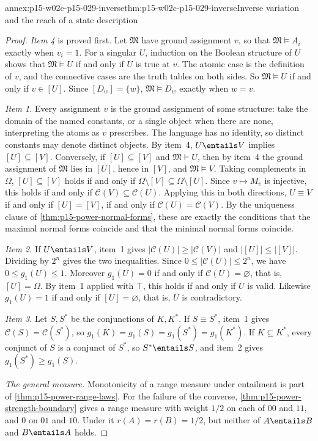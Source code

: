 \begin{annexitem}{annex:p15-w02c-p15-029-inverse}{thm:p15-w02c-p15-029-inverse}{Inverse variation and the reach of a state description}
\begin{proof}
\emph{Item 4} is proved first. Let \(\mathfrak M\) have ground
assignment \(v\), so that \(\mathfrak M\models A_i\) exactly when
\(v_i=1\). For a singular \(U\), induction on the Boolean structure of
\(U\) shows that \(\mathfrak M\models U\) if and only if \(U\) is true at
\(v\). The atomic case is the definition of \(v\), and the connective
cases are the truth tables on both sides. So \(\mathfrak M\models U\) if
and only if \(v\in[U]\). Since \([D_w]=\{w\}\),
\(\mathfrak M\models D_w\) exactly when \(w=v\).

\emph{Item 1.} Every assignment \(v\) is the ground assignment of some
structure: take the domain of the named constants, or a single object
when there are none, interpreting the atoms as \(v\) prescribes. The
language has no identity, so distinct constants may denote distinct
objects. By item~4, \(U\entails V\) implies \([U]\subseteq[V]\).
Conversely, if \([U]\subseteq[V]\) and \(\mathfrak M\models U\), then by
item~4 the ground assignment of \(\mathfrak M\) lies in \([U]\), hence in
\([V]\), and \(\mathfrak M\models V\). Taking complements in \(\Omega\),
\([U]\subseteq[V]\) holds if and only if
\(\Omega\setminus[V]\subseteq\Omega\setminus[U]\). Since
\(v\mapsto M_v\) is injective, this holds if and only if
\(\mathcal C(V)\subseteq\mathcal C(U)\). Applying this in both directions,
\(U\equiv V\) if and only if \([U]=[V]\), if and only if
\(\mathcal C(U)=\mathcal C(V)\). By the uniqueness clause of
\cref{thm:p15-power-normal-forms}, these are exactly the conditions that
the maximal normal forms coincide and that the minimal normal forms
coincide.

\emph{Item 2.} If \(U\entails V\), item~1 gives
\(|\mathcal C(U)|\ge|\mathcal C(V)|\) and \(|[U]|\le|[V]|\). Dividing by
\(2^n\) gives the two inequalities. Since
\(0\le|\mathcal C(U)|\le2^n\), we have \(0\le g_1(U)\le1\). Moreover
\(g_1(U)=0\) if and only if \(\mathcal C(U)=\varnothing\), that is,
\([U]=\Omega\). By item~1 applied with \(\top\), this holds if and only if
\(U\) is valid. Likewise \(g_1(U)=1\) if and only if \([U]=\varnothing\),
that is, \(U\) is contradictory.

\emph{Item 3.} Let \(S,S^\ast\) be the conjunctions of \(K,K^\ast\). If
\(S\equiv S^\ast\), item~1 gives \(\mathcal C(S)=\mathcal C(S^\ast)\),
so \(g_1(K)=g_1(S)=g_1(S^\ast)=g_1(K^\ast)\). If \(K\subseteq K^\ast\),
every conjunct of \(S\) is a conjunct of \(S^\ast\), so
\(S^\ast\entails S\), and item~2 gives \(g_1(S^\ast)\ge g_1(S)\).

\emph{The general measure.} Monotonicity of a range measure under
entailment is part of \cref{thm:p15-power-range-laws}. For the failure of
the converse, \cref{thm:p15-power-strength-boundary} gives a range
measure with weight \(1/2\) on each of \(00\) and \(11\), and \(0\) on
\(01\) and \(10\). Under it \(r(A)=r(B)=1/2\), but neither of
\(A\entails B\) and \(B\entails A\) holds.
\end{proof}
\end{annexitem}

